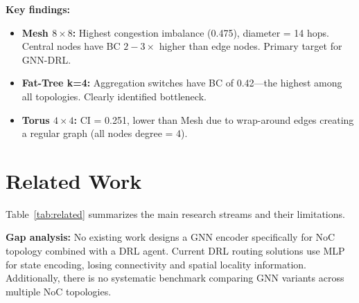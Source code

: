 \documentclass[conference]{IEEEtran}
\begin{document}
\textbf{Key findings:}
\begin{itemize}
 \item \textbf{Mesh $8\times8$:} Highest congestion imbalance (0.475), diameter = 14 hops. Central nodes have BC $2{-}3\times$ higher than edge nodes. Primary target for GNN-DRL.
 \item \textbf{Fat-Tree k=4:} Aggregation switches have BC of 0.42---the highest among all topologies. Clearly identified bottleneck.
 \item \textbf{Torus $4\times4$:} CI = 0.251, lower than Mesh due to wrap-around edges creating a regular graph (all nodes degree = 4).
\end{itemize}

\section{Related Work}
\label{sec:related}

Table~\ref{tab:related} summarizes the main research streams and their limitations.

\begin{table}[h]
\centering
\caption{Analysis of related work}
\label{tab:related}
\centering
{}
\end{table}

\textbf{Gap analysis:} No existing work designs a GNN encoder specifically for NoC topology combined with a DRL agent. Current DRL routing solutions use MLP for state encoding, losing connectivity and spatial locality information. Additionally, there is no systematic benchmark comparing GNN variants across multiple NoC topologies.
\end{document}
